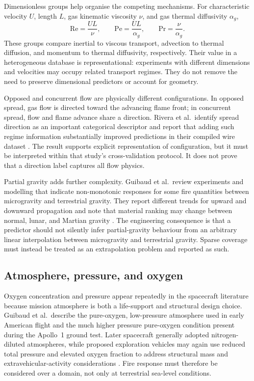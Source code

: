 Dimensionless groups help organise the competing mechanisms. For characteristic velocity \(U\), length \(L\), gas kinematic viscosity \(\nu\), and gas thermal diffusivity \(\alpha_g\),
\begin{equation}
    \mathrm{Re}=\frac{UL}{\nu},
    \qquad
    \mathrm{Pe}=\frac{UL}{\alpha_g},
    \qquad
    \mathrm{Pr}=\frac{\nu}{\alpha_g}.
    \label{eq:dimensionless_groups}
\end{equation}
These groups compare inertial to viscous transport, advection to thermal diffusion, and momentum to thermal diffusivity, respectively. Their value in a heterogeneous database is representational: experiments with different dimensions and velocities may occupy related transport regimes. They do not remove the need to preserve dimensional predictors or account for geometry.

Opposed and concurrent flow are physically different configurations. In opposed spread, gas flow is directed toward the advancing flame front; in concurrent spread, flow and flame advance share a direction. Rivera et al.\ identify spread direction as an important categorical descriptor and report that adding such regime information substantially improved predictions in their compiled wire dataset \cite{riveraWireML}. The result supports explicit representation of configuration, but it must be interpreted within that study's cross-validation protocol. It does not prove that a direction label captures all flow physics.

Partial gravity adds further complexity. Guibaud et al.\ review experiments and modelling that indicate non-monotonic responses for some fire quantities between microgravity and terrestrial gravity. They report different trends for upward and downward propagation and note that material ranking may change between normal, lunar, and Martian gravity \cite{guibaud2022spacecraft}. The engineering consequence is that a predictor should not silently infer partial-gravity behaviour from an arbitrary linear interpolation between microgravity and terrestrial gravity. Sparse coverage must instead be treated as an extrapolation problem and reported as such.

\subsection{Atmosphere, pressure, and oxygen}

Oxygen concentration and pressure appear repeatedly in the spacecraft literature because mission atmosphere is both a life-support and structural design choice. Guibaud et al.\ describe the pure-oxygen, low-pressure atmosphere used in early American flight and the much higher pressure pure-oxygen condition present during the Apollo~1 ground test. Later spacecraft generally adopted nitrogen-diluted atmospheres, while proposed exploration vehicles may again use reduced total pressure and elevated oxygen fraction to address structural mass and extravehicular-activity considerations \cite{guibaud2022spacecraft}. Fire response must therefore be considered over a domain, not only at terrestrial sea-level conditions.

